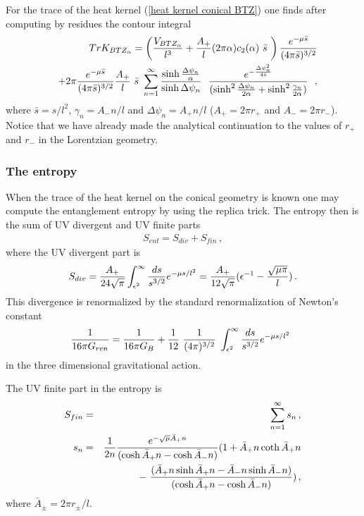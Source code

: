 \documentclass[12pt]{article}
\def\be{\begin{eqnarray}}
\def\ee{\end{eqnarray}}
\def\lb{\label}
\def\o{\over}
\begin{document}
For the trace of  the heat kernel (\ref{heat kernel conical BTZ}) one finds \cite{Mann:1996ze} after computing by residues the contour integral 
\begin{eqnarray}
&&Tr K_{BTZ_{\alpha}}=\left( {V_{BTZ_\alpha}\over l^3}+{A_+\over l}(2\pi\alpha )
c_2(\alpha )~\bar{s}~ \right){e^{-\mu\bar{s}}\over (4\pi \bar{s})^{3/2}}
\nonumber \\
&&+2\pi {e^{-\mu\bar{s}}\over (4\pi \bar{s})^{3/2}}{A_+\over l}~\bar{s}~
\sum_{n=1}^{\infty}{\sinh {\Delta\psi_n\over \alpha}\over \sinh {\Delta\psi_n}}
~~{e^{-{\Delta\psi^2_n\over 4\bar{s}}}\over (\sinh^2{\Delta\psi_n\over 2\alpha}+\sinh^2{\gamma_n\over 2\alpha})}~~,
\label{3.13}
\end{eqnarray}
where $\bar{s}=s/l^2$, $\gamma_n=A_-n/l$ and $\Delta \psi_n=A_+n/l$ ($A_+=2\pi r_+$ and $A_-=2\pi r_-$). Notice that we have already made the analytical continuation to the values of $r_+$ and $r_-$ in the Lorentzian geometry.


\subsubsection{The entropy} 
When the trace of the heat kernel    on the conical geometry is known one may compute the entanglement entropy by using the replica trick. The entropy then
is the sum of UV divergent and UV finite   parts \cite{Mann:1996ze}
\be
S_{ent}=S_{div}+S_{fin}\, ,
\lb{BTZ entropy}
\ee
where the UV divergent part is
\be
S_{div}={A_+\o 24\sqrt{\pi}}\int_{\epsilon^2}^{\infty}{ds\over s^{3/2}}e^{-\mu s/ l^2}={A_+\o 12\sqrt{\pi}}(\epsilon^{-1}-{\sqrt{\mu\pi }\o l})\, .
\lb{UV div entropy}
\ee
This divergence is renormalized by the standard renormalization of Newton's constant
\begin{equation}
{1\over 16\pi G_{ren}}={1\over 16\pi G_B}+{1\over 12}~
{1\over (4\pi)^{3/2}}~\int_{\epsilon^2}^{\infty}{ds\over s^{3/2}}e^{-\mu s/ l^2~}\, 
\label{renormalized GN}
\end{equation}
in the three dimensional gravitational action.

The  UV finite part in the entropy is                            
\begin{eqnarray}
S_{fin}&=&\sum_{n=1}^\infty
s_n \, , \nonumber \\
s_n&=&{1\over 2n}{e^{-\sqrt{\mu}\bar{A}_+ n}\over (\cosh \bar{A}_+n-\cosh \bar{A}_-n)}
(1+\bar{A}_+ n \coth \bar{A}_+ n \nonumber \\
&&-\  {(\bar{A}_+n \sinh \bar{A}_+ n -
\bar{A}_-n \sinh \bar{A}_-n )\over (\cosh \bar{A}_+n-\cosh \bar{A}_-n)}
)\, ,
\label{UV finite entropy}
\end{eqnarray}                           
where $\bar{A}_\pm=2\pi r_\pm/l$.                             
\end{document}

